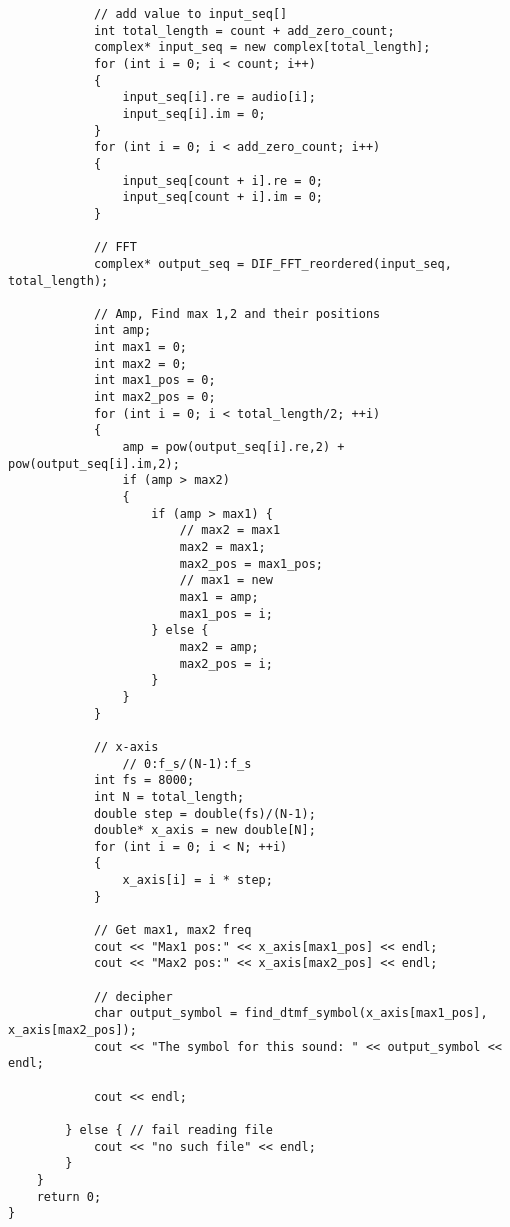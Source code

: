 \begin{lstlisting}
			// add value to input_seq[]
			int total_length = count + add_zero_count;
			complex* input_seq = new complex[total_length];
			for (int i = 0; i < count; i++)
			{
				input_seq[i].re = audio[i];
				input_seq[i].im = 0;
			}
			for (int i = 0; i < add_zero_count; i++)
			{
				input_seq[count + i].re = 0;
				input_seq[count + i].im = 0;
			}

			// FFT
			complex* output_seq = DIF_FFT_reordered(input_seq, total_length);

			// Amp, Find max 1,2 and their positions
			int amp;
			int max1 = 0;
			int max2 = 0;
			int max1_pos = 0;
			int max2_pos = 0;
			for (int i = 0; i < total_length/2; ++i)
			{
				amp = pow(output_seq[i].re,2) + pow(output_seq[i].im,2);
				if (amp > max2)
				{
					if (amp > max1) {
						// max2 = max1
						max2 = max1;
						max2_pos = max1_pos;
						// max1 = new
						max1 = amp;
						max1_pos = i;
					} else {
						max2 = amp;
						max2_pos = i;
					}
				}
			}

			// x-axis
				// 0:f_s/(N-1):f_s
			int fs = 8000;
			int N = total_length;
			double step = double(fs)/(N-1);
			double* x_axis = new double[N];
			for (int i = 0; i < N; ++i)
			{
				x_axis[i] = i * step;
			}

			// Get max1, max2 freq
			cout << "Max1 pos:" << x_axis[max1_pos] << endl;
			cout << "Max2 pos:" << x_axis[max2_pos] << endl;

			// decipher
			char output_symbol = find_dtmf_symbol(x_axis[max1_pos], x_axis[max2_pos]);
			cout << "The symbol for this sound: " << output_symbol << endl;

			cout << endl;

		} else { // fail reading file
			cout << "no such file" << endl;
		}
    }  
	return 0;
}
\end{lstlisting}

